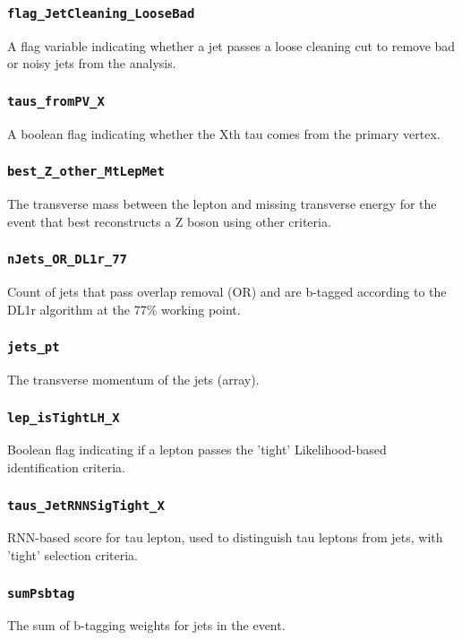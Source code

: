 \subsubsection{\texttt{flag\_JetCleaning\_LooseBad}} A flag variable indicating whether a jet passes a loose cleaning cut
to remove bad or noisy jets from the analysis.

\subsubsection{\texttt{taus\_fromPV\_X}} A boolean flag indicating whether the Xth tau comes from the primary vertex.

\subsubsection{\texttt{best\_Z\_other\_MtLepMet}} The transverse mass between the lepton and missing transverse energy for
the event that best reconstructs a Z boson using other criteria.

\subsubsection{\texttt{nJets\_OR\_DL1r\_77}} Count of jets that pass overlap removal (OR) and are b-tagged according to the
DL1r algorithm at the 77\% working point.

\subsubsection{\texttt{jets\_pt}} The transverse momentum of the jets (array).

\subsubsection{\texttt{lep\_isTightLH\_X}} Boolean flag indicating if a lepton passes the 'tight' Likelihood-based
identification criteria.

\subsubsection{\texttt{taus\_JetRNNSigTight\_X}} RNN-based score for tau lepton, used to distinguish tau leptons from
jets, with 'tight' selection criteria.

\subsubsection{\texttt{sumPsbtag}} The sum of b-tagging weights for jets in the event.

